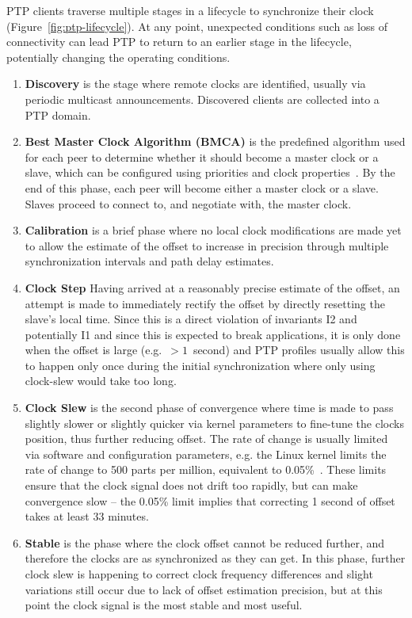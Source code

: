PTP clients traverse multiple stages in a lifecycle to synchronize their clock (Figure~\ref{fig:ptp-lifecycle}). At any point, unexpected conditions such as loss of connectivity can lead PTP to return to an earlier stage in the lifecycle, potentially changing the operating conditions.

\begin{enumerate}[label=S\arabic*.]
    \item \textbf{Discovery} is the stage where remote clocks are identified, usually via periodic multicast announcements. Discovered clients are collected into a PTP domain.
    \item \textbf{Best Master Clock Algorithm (BMCA)} is the predefined algorithm used for each peer to determine whether it should become a master clock or a slave, which can be configured using priorities and clock properties~\cite{bmca-deep-dive}. By the end of this phase, each peer will become either a master clock or a slave. Slaves proceed to connect to, and negotiate with, the master clock.
    \item \textbf{Calibration} is a brief phase where no local clock modifications are made yet to allow the estimate of the offset to increase in precision through multiple synchronization intervals and path delay estimates.
    \item \textbf{Clock Step} Having arrived at a reasonably precise estimate of the offset, an attempt is made to immediately rectify the offset by directly resetting the slave's local time. Since this is a direct violation of invariants I2 and potentially I1 and since this is expected to break applications, it is only done when the offset is large (e.g.~$>1$~second) and PTP profiles usually allow this to happen only once during the initial synchronization where only using clock-slew would take too long.
    \item \textbf{Clock Slew} is the second phase of convergence where time is made to pass slightly slower or slightly quicker via kernel parameters to fine-tune the clocks position, thus further reducing offset. The rate of change is usually limited via software and configuration parameters, e.g. the Linux kernel limits the rate of change to 500 parts per million, equivalent to 0.05\%~\cite{adjtimex}. These limits ensure that the clock signal does not drift too rapidly, but can make convergence slow -- the 0.05\% limit implies that correcting 1 second of offset takes at least 33 minutes.
    \item \textbf{Stable} is the phase where the clock offset cannot be reduced further, and therefore the clocks are as synchronized as they can get. In this phase, further clock slew is happening to correct clock frequency differences and slight variations still occur due to lack of offset estimation precision, but at this point the clock signal is the most stable and most useful.
\end{enumerate}